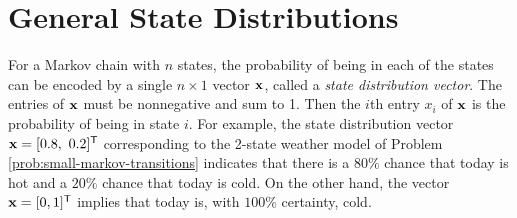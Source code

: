 

\section*{General State Distributions} %

\begin{comment} %
For an $n\times 1$ vector $\x$ with entries $x_i$ and an $n\times n$ matrix $A$ with entries $a_{ij}$, the \emph{1-norm} is defined as follows.
\begin{align*}
\|\x\|_1 = \sum_{i=1}^n|x_i| && \|A\|_1 = \sup_j \sum_{i=1}^n |a_{ij}|
\end{align*}
In other words, the $1$-norm for both vectors and matrices is the maximum absolute column sum.
Then if $A$ is a transition matrix, $\|A\|_1 = 1$, since each of the entries of the matrix are positive and each of the columns sum to $1$ by definition.
The power method with the 1-norm can be used to find the unique stable steady state distribution of $A$.
\end{comment}

For a Markov chain with $n$ states, the probability of being in each of the states can be encoded by a single $n \times 1$ vector $\mathbf{x}$, called a \emph{state distribution vector}.
The entries of $\mathbf{x}$ must be nonnegative and sum to 1.
Then the $i$th entry $x_i$ of $\mathbf{x}$ is the probability of being in state $i$.
For example, the state distribution vector $\mathbf{x} = [0.8,\ 0.2]^{\mathsf T}$ corresponding to the 2-state weather model of Problem \ref{prob:small-markov-transitions} indicates that there is a $80\%$ chance that today is hot and a $20\%$ chance that today is cold.
On the other hand, the vector $\mathbf{x} = [0, 1]^{\mathsf T}$ implies that today is, with $100\%$ certainty, cold.

